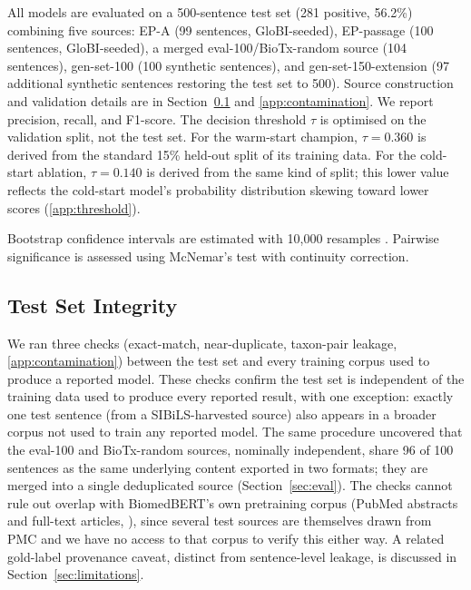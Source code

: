 \documentclass[a4paper,fleqn]{cas-sc}
\begin{document}
All models are evaluated on a 500-sentence test set (281 positive,
56.2\%) combining five sources: EP-A (99 sentences, GloBI-seeded),
EP-passage (100 sentences, GloBI-seeded), a merged eval-100/BioTx-random
source (104 sentences), gen-set-100 (100 synthetic sentences), and
gen-set-150-extension (97 additional synthetic sentences restoring
the test set to 500). Source construction and validation details are
in Section~\ref{sec:contamination} and \ref{app:contamination}.
We report precision, recall, and F1-score.
The decision threshold $\tau$ is optimised on the validation split,
not the test set. For the warm-start champion, $\tau = 0.360$ is derived
from the standard 15\% held-out split of its training data. For the
cold-start ablation, $\tau = 0.140$ is derived from the same kind of split;
this lower value reflects the cold-start model's probability
distribution skewing toward lower scores (\ref{app:threshold}).

Bootstrap confidence intervals are estimated with 10,000 resamples
\citep{efron1993introduction}.
Pairwise significance is assessed using McNemar's test
\citep{mcnemar1947note} with continuity correction.

\subsection{Test Set Integrity}
\label{sec:contamination}

We ran three checks (exact-match, near-duplicate, taxon-pair leakage,
\ref{app:contamination}) between the test set and every
training corpus used to produce a reported model. These checks confirm
the test set is independent of the training data used to produce every
reported result, with one exception: exactly one test sentence (from a
SIBiLS-harvested source) also appears in a broader corpus not used to
train any reported model. The same procedure uncovered that the
eval-100 and BioTx-random sources, nominally independent, share 96 of
100 sentences as the same underlying content exported in two formats;
they are merged into a single deduplicated source (Section~\ref{sec:eval}).
The checks cannot rule out overlap with BiomedBERT's own pretraining
corpus (PubMed abstracts and full-text articles,
\citep{gu2021domain}), since several test sources are themselves
drawn from PMC and we have no access to that corpus to verify this
either way. A related gold-label provenance caveat, distinct from
sentence-level leakage, is discussed in Section~\ref{sec:limitations}.

\end{document}
